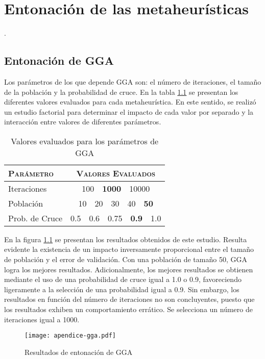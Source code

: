 \chapter{Entonación de las metaheurísticas}
\label{apendiceA}
.

\section{Entonación de GGA}

Los parámetros de los que depende GGA son: el número de iteraciones, el tamaño de la población y la probabilidad de cruce. En la tabla \ref{table-ap-gga} se presentan los diferentes valores evaluados para cada metaheurística. En este sentido, se realizó un estudio factorial para determinar el impacto de cada valor por separado y la interacción entre valores de diferentes parámetros.

\begin{table}[h!]
\centering
\begin{tabular}{l c}
\hline
\textsc{Parámetro} & \textsc{Valores Evaluados} \\
\hline
\hline
Iteraciones & 100\ \ \textbf{1000}\ \ 10000 \\
Población   & 10\ \ 20\ \ 30\ \ 40\ \ \textbf{50} \\
Prob. de Cruce & 0.5\ \ 0.6\ \ 0.75\ \ \textbf{0.9}\ \ 1.0\\
\hline
\end{tabular}
\caption{Valores evaluados para los parámetros de GGA}
\label{table-ap-gga}
\end{table}

En la figura \ref{fig-ap-gga} se presentan los resultados obtenidos de este estudio. Resulta evidente la existencia de un impacto inversamente proporcional entre el tamaño de población y el error de validación. Con una población de tamaño 50, GGA logra los mejores resultados.
Adicionalmente, los mejores resultados se obtienen mediante el uso de una probabilidad de cruce igual a 1.0 o 0.9, favoreciendo ligeramente a la selección de una probabilidad igual a 0.9.
Sin embargo, los resultados en función del número de iteraciones no son concluyentes, puesto que los resultados exhiben un comportamiento errático. Se selecciona un número de iteraciones igual a 1000.

\begin{figure}[h!]
\centering
\texttt{[image: apendice-gga.pdf]}
\caption{Resultados de entonación de GGA}
\label{fig-ap-gga}
\end{figure}

